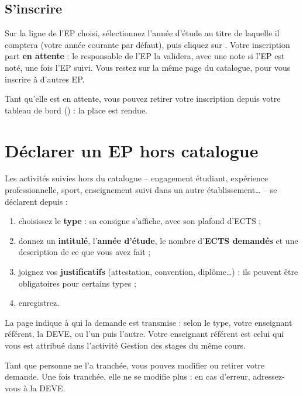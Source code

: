 \documentclass[11pt,a4paper]{article}
\begin{document}
\subsection{S'inscrire}

Sur la ligne de l'EP choisi, sélectionnez l'année d'étude au titre de laquelle il comptera (votre
année courante par défaut), puis cliquez sur . Votre inscription part
\textbf{en attente} : le responsable de l'EP la validera, avec une note si l'EP est noté, une fois
l'EP suivi. Vous restez sur la même page du catalogue, pour vous inscrire à d'autres EP.

Tant qu'elle est en attente, vous pouvez retirer votre inscription depuis votre tableau de bord
() : la place est rendue.

\section{Déclarer un EP hors catalogue}

Les activités suivies hors du catalogue -- engagement étudiant, expérience professionnelle,
sport, enseignement suivi dans un autre établissement\dots{} -- se déclarent depuis
 :
\begin{enumerate}
  \item choisissez le \textbf{type} : sa consigne s'affiche, avec son plafond d'ECTS ;
  \item donnez un \textbf{intitulé}, l'\textbf{année d'étude}, le nombre d'\textbf{ECTS demandés}
    et une description de ce que vous avez fait ;
  \item joignez vos \textbf{justificatifs} (attestation, convention, diplôme\dots) : ils peuvent
    être obligatoires pour certains types ;
  \item enregistrez.
\end{enumerate}


La page indique à qui la demande est transmise : selon le type, votre enseignant référent, la
DEVE, ou l'un puis l'autre. Votre enseignant référent est celui qui vous est attribué dans
l'activité \og Gestion des stages\fg{} du même cours.

Tant que personne ne l'a tranchée, vous pouvez modifier ou retirer votre demande. Une fois
tranchée, elle ne se modifie plus : en cas d'erreur, adressez-vous à la DEVE.
\end{document}
